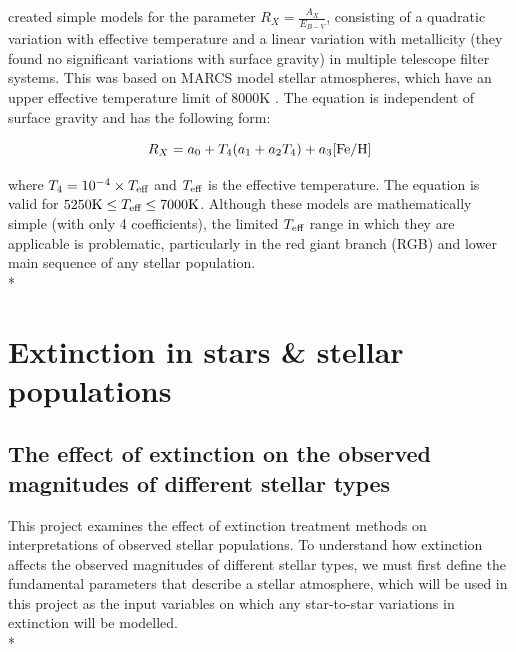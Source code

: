 \documentclass[12pt, a4paper]{report}
\begin{document}
\cite{2014MNRAS.444..392C,2018MNRAS.475.5023C,2018MNRAS.479L.102C} created simple  models for the parameter $R_{X}  = \frac{A_{X}}{E_{B-V}}$, consisting of a quadratic variation with effective temperature and a linear variation with metallicity (they found no significant variations with surface gravity) in multiple telescope filter systems. This was based on MARCS model stellar atmospheres, which have an upper effective temperature limit of 8000K \citep{2008A&A...486..951G}. The equation is independent of surface gravity and has the following form:

\begin{equation}
R_{X} = a_{0} + T_{4}(a_{1} + a_{2}T_{4}) + a_{3}\textnormal{[Fe/H]}
\label{casagrande_ext_fit}
\end{equation}

where $T_{4} = 10^{-4} \times T_{\textnormal{eff}}$ and $T_{\textnormal{eff}}$ is the effective temperature. The equation is valid for $5250\textnormal{K} \leq T_{\textnormal{eff}} \leq 7000\textnormal{K}$. Although these models are mathematically simple (with only 4 coefficients), the limited $T_{\textnormal{eff}}$ range in which they are applicable is problematic, particularly in the red giant branch (RGB) and lower main sequence of any stellar population.\\*

\section{Extinction in stars \& stellar populations}

\subsection{The effect of extinction on the observed magnitudes of different stellar types} \label{params}


This project examines the effect of extinction treatment methods on interpretations of observed stellar populations. To understand how extinction affects the observed magnitudes of different stellar types, we must first define the fundamental parameters that describe a stellar atmosphere, which will be used in this project as the input variables on which any star-to-star variations in extinction will be modelled. \\*
\end{document}
